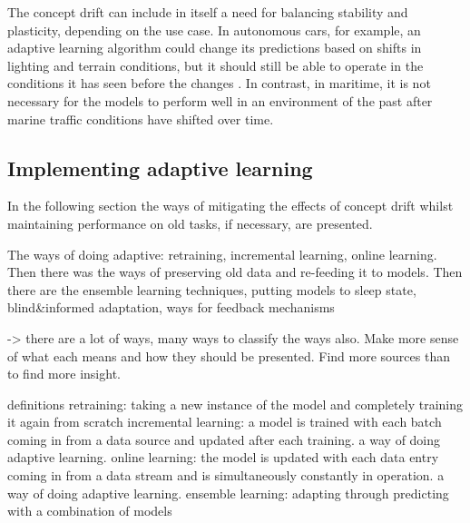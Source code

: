 The concept drift can include in itself a need for balancing stability and plasticity, depending on the use case. In autonomous cars, for example, an adaptive learning algorithm could change its predictions based on shifts in lighting and terrain conditions, but it should still be able to operate in the conditions it has seen before the changes \cite{conceptdriftsurvey}. In contrast, in maritime, it is not necessary for the models to perform well in an environment of the past after marine traffic conditions have shifted over time.




\subsection{Implementing adaptive learning}

In the following section the ways of mitigating the effects of concept drift whilst maintaining performance on old tasks, if necessary, are presented.

The ways of doing adaptive: retraining, incremental learning, online learning. Then there was the ways of preserving old data and re-feeding it to models. Then there are the ensemble learning techniques, putting models to sleep state, blind&informed adaptation, ways for feedback mechanisms

-> there are a lot of ways, many ways to classify the ways also. Make more sense of what each means and how they should be presented. Find more sources than \cite{conceptdriftsurvey} to find more insight.

definitions
 retraining: taking a new instance of the model and completely training it again from scratch
	    incremental learning: a model is trained with each batch coming in from a data source and updated after each training. a way of doing adaptive learning.
	    online learning: the model is updated with each data entry coming in from a data stream and is simultaneously constantly in operation. a way of doing adaptive learning.
	    ensemble learning: adapting through predicting with a combination of models

